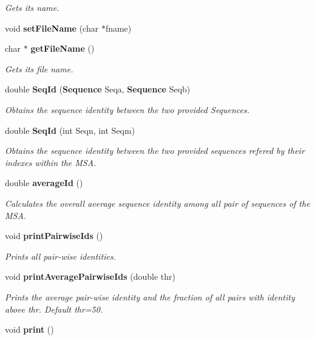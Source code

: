 \begin{CompactItemize}
\begin{CompactList}\small\item\em Gets its name. \item\end{CompactList}\item 
void {\bf set\-File\-Name} (char $\ast$fname)
\item 
char $\ast$ {\bf get\-File\-Name} ()\label{classMultipleSeqAlign_a7}

\begin{CompactList}\small\item\em Gets its file name. \item\end{CompactList}\item 
double {\bf Seq\-Id} ({\bf Sequence} Seqa, {\bf Sequence} Seqb)\label{classMultipleSeqAlign_a8}

\begin{CompactList}\small\item\em Obtains the sequence identity between the two provided Sequences. \item\end{CompactList}\item 
double {\bf Seq\-Id} (int Seqn, int Seqm)\label{classMultipleSeqAlign_a9}

\begin{CompactList}\small\item\em Obtains the sequence identity between the two provided sequences refered by their indexes within the MSA. \item\end{CompactList}\item 
double {\bf average\-Id} ()\label{classMultipleSeqAlign_a10}

\begin{CompactList}\small\item\em Calculates the overall average sequence identity among all pair of sequences of the MSA. \item\end{CompactList}\item 
void {\bf print\-Pairwise\-Ids} ()\label{classMultipleSeqAlign_a11}

\begin{CompactList}\small\item\em Prints all pair-wise identities. \item\end{CompactList}\item 
void {\bf print\-Average\-Pairwise\-Ids} (double thr)
\begin{CompactList}\small\item\em Prints the average pair-wise identity and the fraction of all pairs with identity above thr. Default thr=50. \item\end{CompactList}\item 
void {\bf print} ()\label{classMultipleSeqAlign_a13}


\end{CompactItemize}

